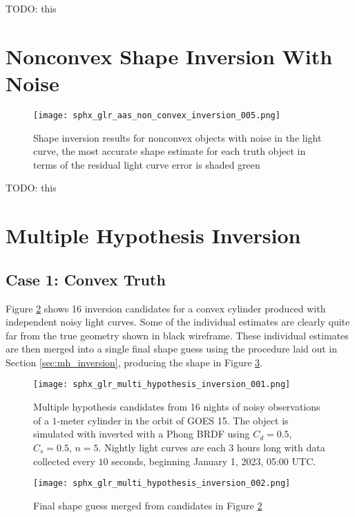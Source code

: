 TODO: this

\clearpage
\section{Nonconvex Shape Inversion With Noise}

\begin{figure}[!htb]
  \centering
  \texttt{[image: sphx\_glr\_aas\_non\_convex\_inversion\_005.png]}
  \caption{Shape inversion results for nonconvex objects with noise in the light curve, the most accurate shape estimate for each truth object in terms of the residual light curve error is shaded green}
  \label{fig:res_nonconvex_with_noise}
\end{figure}

TODO: this

\section{Multiple Hypothesis Inversion}

\subsection{Case 1: Convex Truth}

Figure \ref{fig:multi_hyp_candidates_cvx} shows 16 inversion candidates for a convex cylinder produced with independent noisy light curves. Some of the individual estimates are clearly quite far from the true geometry shown in black wireframe. These individual estimates are then merged into a single final shape guess using the procedure laid out in Section \ref{sec:mh_inversion}, producing the shape in Figure \ref{fig:multi_hyp_final_cvx}.

\begin{figure}[!htb]
    \centering
    \texttt{[image: sphx\_glr\_multi\_hypothesis\_inversion\_001.png]}
    \caption{Multiple hypothesis candidates from 16 nights of noisy observations of a $1$-meter cylinder in the orbit of GOES 15. The object is simulated with inverted with a Phong BRDF using $C_d=0.5$, $C_s=0.5$, $n=5$. Nightly light curves are each $3$ hours long with data collected every $10$ seconds, beginning January 1, 2023, 05:00 UTC.}
    \label{fig:multi_hyp_candidates_cvx}
\end{figure}

\begin{figure}[!htb]
  \centering
  \texttt{[image: sphx\_glr\_multi\_hypothesis\_inversion\_002.png]}
  \caption{Final shape guess merged from candidates in Figure \ref{fig:multi_hyp_candidates_cvx}}
  \label{fig:multi_hyp_final_cvx}
\end{figure}

